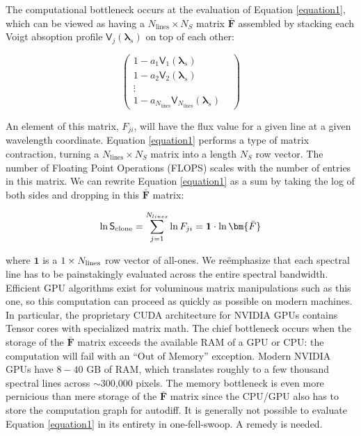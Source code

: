 \documentclass[modern]{aastex631}
\begin{document}
The computational bottleneck occurs at the evaluation of Equation \ref{equation1}, which can be viewed as having a $N_{\mathrm{lines}}\times N_{S}$ matrix $\bm{\bar{F}}$ assembled by stacking each Voigt absoption profile $\mathsf{V}_j(\bm{\lambda}_s)$ on top of each other:

\begin{equation}
    \begin{pmatrix}
        1 - a_1 \mathsf{V}_1(\bm{\lambda}_s)                                       & \\
        1 - a_2 \mathsf{V}_2(\bm{\lambda}_s)                                       & \\
        \vdots                                                                     & \\
        1 - a_{N_{\mathrm{lines}}} \mathsf{V}_{N_{\mathrm{lines}}}(\bm{\lambda}_s) &
    \end{pmatrix}
\end{equation}

An element of this matrix, $F_{ji}$, will have the flux value for a given line at a given wavelength coordinate. Equation \ref{equation1} performs a type of matrix contraction, turning a $N_{\mathrm{lines}}\times N_{S}$ matrix into a length $N_{S}$ row vector. The number of Floating Point Operations (FLOPS) scales with the number of entries in this matrix. We can rewrite Equation \ref{equation1} as a sum by taking the log of both sides and dropping in this $\bm{\bar{F}}$ matrix:

\begin{eqnarray}
    \ln{\mathsf{S}_{\rm clone}} = \sum_{j=1}^{N_{lines}} \ln{F_{ji}} = \mathbf{1} \cdot \ln{\bm{\bar{F}}}
\end{eqnarray}


where $\mathbf{1}$ is a $1\times N_{\rm lines}$ row vector of all-ones. We re\"emphasize that each spectral line has to be painstakingly evaluated across the entire spectral bandwidth.   Efficient GPU algorithms exist for voluminous matrix manipulations such as this one, so this computation can proceed as quickly as possible on modern machines. In particular, the proprietary CUDA architecture for NVIDIA\textsuperscript{\tiny\textregistered} GPUs contains Tensor cores with specialized matrix math. The chief bottleneck occurs when the storage of the $\bm{\bar{F}}$ matrix exceeds the available RAM of a GPU or CPU: the computation will fail with an ``Out of Memory'' exception. Modern NVIDIA GPUs have $8-40$ GB of RAM, which translates roughly to a few thousand spectral lines across $\sim$300,000 pixels.  The memory bottleneck is even more pernicious than mere storage of the $\bm{\bar{F}}$ matrix since the CPU/GPU also has to store the computation graph for autodiff. It is generally not possible to evaluate Equation \ref{equation1} in its entirety in one-fell-swoop. A remedy is needed.
\end{document}
